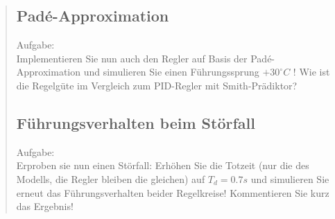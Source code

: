 \begin{quote}
    
    \subsection{Pad\'e-Approximation}
    Aufgabe:\\
    Implementieren Sie nun auch den Regler auf Basis der Pad\'e-Approximation und simulieren Sie einen Führungssprung
    $+30^{\circ} C$ ! Wie ist die Regelgüte im Vergleich zum PID-Regler mit Smith-Prädiktor?\vspace{1em}
    
    \begin{quote}
        
    \end{quote}
    
    
    \subsection{Führungsverhalten beim Störfall}
    Aufgabe:\\
    Erproben sie nun einen Störfall: Erhöhen Sie die Totzeit (nur die des Modells, die Regler bleiben die gleichen)
    auf $T_d = 0.7s$ und simulieren Sie erneut das Führungsverhalten beider Regelkreise! Kommentieren Sie kurz das
    Ergebnis!\vspace{1em}
    
    \begin{quote}
        
    \end{quote}
    
    
    
\end{quote}




